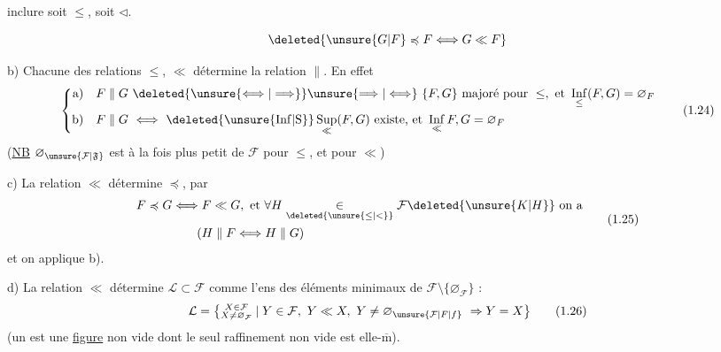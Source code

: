 inclure soit $\leq$, soit $\triangleleft$.

\[
\deleted{\unsure{G|F}\preccurlyeq F\Longleftrightarrow G\ll F}
\]

b) Chacune des relations $\leq$, $\ll$ détermine la relation $\parallel$. En effet
\[
\left\{\begin{aligned}
\text{a)}\quad F\parallel G &\ \deleted{\unsure{\Longleftrightarrow|\Longrightarrow}}\unsure{\Longrightarrow|\Longleftrightarrow}\
 \{F,G\}\ \text{majoré pour }\leq,\ \text{et }\mathop{\mathrm{Inf}}\limits_{\leq}(F,G)=\varnothing_F\\
\text{b)}\quad F\parallel G &\ \Longleftrightarrow\
 \deleted{\unsure{\mathrm{Inf}|\mathrm{S}}}\mathop{\mathrm{Sup}}\limits_{\ll}(F,G)\ \text{existe, et }\mathop{\mathrm{Inf}}\limits_{\ll} F,G=\varnothing_F
\end{aligned}\right.
\tag*{(1.24)}
\]
(\uline{NB} $\varnothing_{\unsure{\mathcal{F}|\mathfrak{F}}}$ est à la fois plus petit  de $\mathcal{F}$ pour $\leq$, et pour $\ll$)

c) La relation $\ll$ détermine $\preccurlyeq$, par
\margin{$\times$}
\[
\begin{aligned}
F\preccurlyeq G &\Longleftrightarrow F\ll G,\ \text{et }\forall H\underset{\deleted{\unsure{\leq|<}}}{\in}\mathcal{F}\deleted{\unsure{K|H}}\ \text{on a}\\
&\hspace{2em}(H\parallel F\Longleftrightarrow H\parallel G)
\end{aligned}
\tag*{(1.25)}
\]
et on applique b).

d) La relation $\ll$ détermine $\mathcal{L}\subset\mathcal{F}$ comme l'ens des éléments minimaux de $\mathcal{F}\setminus\{\varnothing_{\mathcal{F}}\}$ :
\[
\mathcal{L}=\bigl\{\substack{X\in\mathcal{F}\\ X\neq\varnothing_{\mathcal{F}}}\mid
 Y\in\mathcal{F},\ Y\ll X,\ Y\neq\varnothing_{\unsure{\mathcal{F}|F|f}}\ \Rightarrow Y=X\bigr\} \tag*{(1.26)}
\]
(un \unsure{lieu|lien} est une \uline{figure} non vide dont le seul raffinement non vide est elle-$\overline{\mathrm m}$).

